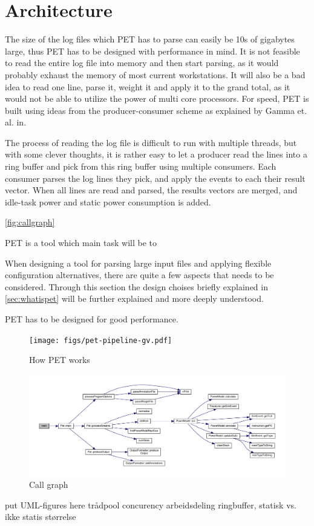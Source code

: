 \section{Architecture}

The size of the log files which PET has to parse can easily be 10s of gigabytes
large, thus PET has to be designed with performance in mind. It is not feasible
to read the entire log file into memory and then start parsing, as it would
probably exhaust the memory of most current workstations. It will also be a bad
idea to read one line, parse it, weight it and apply it to the grand total, as
it would not be able to utilize the power of multi core processors. For speed,
PET is built using ideas from the producer-consumer scheme as explained by Gamma
et. al. in\cite{designpatterns}.

The process of reading the log file is difficult to run with multiple threads, but
with some clever thoughts, it is rather easy to let a producer read the lines into a ring buffer
and pick from this ring buffer using multiple consumers. Each consumer parses the log lines
they pick, and apply the events to each their result vector. When all lines are read and parsed,
the results vectors are merged, and idle-task power and static power consumption is added.

\autoref{fig:callgraph}


PET is a tool which main task will be to 

When designing a tool for parsing large input files and applying flexible configuration alternatives,
there are quite a few aspects that needs to be considered. Through this section the design choises
briefly explained in \autoref{sec:whatispet} will be further explained and more deeply understood.

PET has to be designed for good performance.


\begin{figure}
    \texttt{[image: figs/pet-pipeline-gv.pdf]}
    \caption{How PET works}
    \label{fig:pipeline}
\end{figure}

\begin{figure}
%    
    \includegraphics[width=\textwidth]{figs/maincallgraph.pdf}
    \caption{Call graph}
    \label{fig:callgraph}
\end{figure}

put UML-figures here
trådpool
concurency
arbeidsdeling
ringbuffer, statisk vs. ikke statis størrelse




